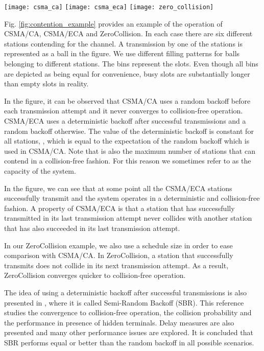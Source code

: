 \documentclass[journal]{IEEEtran}
\begin{document}
\begin{figure*}\centering
  \texttt{[image: csma\_ca]}
  \qquad
  \texttt{[image: csma\_eca]}
  \qquad
  \texttt{[image: zero\_collision]}
  \caption{An example of CSMA/CA (left), CSMA/ECA (center) and ZeroCollision (right) execution.}\label{fig:contention_example}\end{figure*}

Fig. \ref{fig:contention_example} provides an example of the operation of CSMA/CA, CSMA/ECA and ZeroCollision. In each case there are six different stations contending for the channel. A transmission by one of the stations is represented as a ball in the figure. We use different filling patterns for balls belonging to different stations. The bins represent the slots. Even though all bins are depicted as being equal for convenience, busy slots are substantially longer than empty slots in reality.

In the figure, it can be observed that CSMA/CA uses a random backoff before each transmission attempt and it never converges to collision-free operation. CSMA/ECA uses a deterministic backoff after successful transmissions and a random backoff otherwise. The value of the deterministic backoff is constant for all stations, , which is equal to the expectation of the random backoff which is used in CSMA/CA. Note that  is also the maximum number of stations that can contend in a collision-free fashion. For this reason we sometimes refer to  as the capacity of the system.

In the figure, we can see that at some point all the CSMA/ECA stations successfully transmit and the system operates in a deterministic and collision-free fashion. A property of CSMA/ECA is that a station that has successfully transmitted in its last transmission attempt never collides with another station that has also succeeded in its last transmission attempt.

In our ZeroCollision example, we also use a schedule size  in order to ease comparison with CSMA/CA. In ZeroCollision, a station that successfully transmits does not collide in its next transmission attempt. As a result, ZeroCollision converges quicker to collision-free operation.

The idea of using a deterministic backoff after successful transmissions is also presented in \cite{he2009sbr}, where it is called Semi-Random Backoff (SBR). This reference studies the convergence to collision-free operation, the collision probability and the performance in presence of hidden terminals. Delay measures are also presented and many other performance issues are explored. It is concluded that SBR performs equal or better than the random backoff in all possible scenarios.
\end{document}
